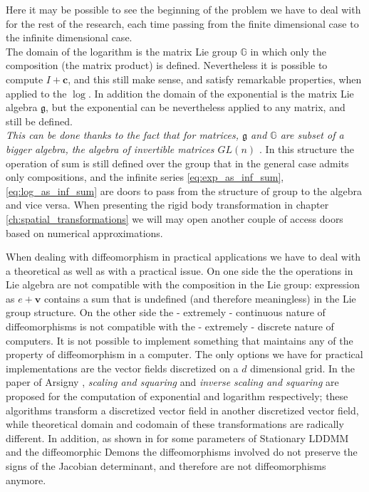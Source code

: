 Here it may be possible to see the beginning of the problem we have to deal with for the rest of the research, each time passing from the finite dimensional case to the infinite dimensional case.\\
The domain of the logarithm is the matrix Lie group $\mathbb{G}$ in which only the composition (the matrix product) is defined. Nevertheless it is possible to compute $I + \mathbf{c}$, and this still make sense, and satisfy remarkable properties, when applied to the $\log$. In addition the domain of the exponential is the matrix Lie algebra $\mathfrak{g}$, but the exponential can be nevertheless applied to any matrix, and still be defined.\\
\emph{This can be done thanks to the fact that for matrices, $\mathfrak{g}$ and $\mathbb{G}$ are subset of a bigger algebra, the algebra of invertible matrices $GL(n)$ \cite{kirillov2008introduction}}. In this structure the operation of sum is still defined over the group that in the general case admits only compositions, and the infinite series \ref{eq:exp_as_inf_sum}, \ref{eq:log_as_inf_sum} are doors to pass from the structure of group to the algebra and vice versa. When presenting the rigid body transformation in chapter \ref{ch:spatial_transformations} we will may open another couple of access doors based on numerical approximations.

When dealing with diffeomorphism in practical applications we have to deal with a theoretical as well as with a practical issue.
On one side the
the operations in Lie algebra are not compatible with the composition in the Lie group: expression as $e + \mathbf{v}$ contains a sum that is undefined (and therefore meaningless) in the Lie group structure.
On the other side 
the - extremely - continuous nature of diffeomorphisms is not compatible with the - extremely - discrete nature of computers. It is not possible to implement something that maintains any of the property of diffeomorphism in a computer. The only options we have for practical implementations are the vector fields discretized on a $d$ dimensional grid. In the paper of Arsigny \cite{arsigny2006log}, \emph{scaling and squaring} and \emph{inverse scaling and squaring} are proposed for the computation of exponential and logarithm respectively; these algorithms transform a discretized vector field in another discretized vector field, while theoretical domain and codomain of these transformations are radically different. In addition, as shown in \cite{hernandez2008comparing} for some parameters of Stationary LDDMM and the diffeomorphic Demons the diffeomorphisms involved do not preserve the signs of the Jacobian determinant, and therefore are not diffeomorphisms anymore. 

